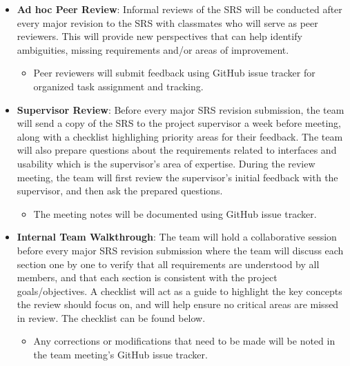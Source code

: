 \documentclass[12pt, titlepage]{article}
\begin{document}
\begin{itemize}
  \item \textbf{Ad hoc Peer Review}: Informal reviews of the SRS will be conducted after every major revision 
  to the SRS with classmates who will serve as peer reviewers. This will provide new perspectives that can 
  help identify ambiguities, missing requirements and/or areas of improvement. 
  \begin{itemize}
    \item Peer reviewers will submit feedback using GitHub issue tracker for organized task assignment and tracking.
  \end{itemize}
  \item \textbf{Supervisor Review}: Before every major SRS revision submission, the team will 
  send a copy of the SRS to the project supervisor a week before meeting, along with a checklist highlighing 
  priority areas for their feedback. The team will also prepare questions about the requirements related to 
  interfaces and usability which is the supervisor's area of expertise. During the review meeting, the team will 
  first review the supervisor's initial feedback with the supervisor, and then ask the prepared questions.
  \begin{itemize}
    \item The meeting notes will be documented using GitHub issue tracker.
  \end{itemize}
  \item \textbf{Internal Team Walkthrough}: The team will hold a collaborative session 
  before every major SRS revision submission where the team will discuss each section one 
  by one to verify that all requirements are understood by all members, and that each section 
  is consistent with the project goals/objectives. A checklist will act as a guide to highlight the key concepts 
  the review should focus on, and will help ensure no critical areas are missed in review. The checklist can be found 
  below.
  \begin{itemize}
    \item Any corrections or modifications that need to be made will be noted in the team 
    meeting's GitHub issue tracker.
  \end{itemize}
\end{itemize}
\end{document}
